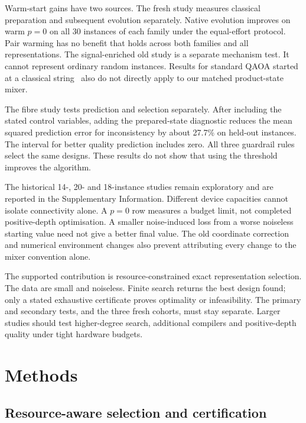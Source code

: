 \documentclass[a4paper,onecolumn,11pt,unpublished]{quantumarticle}
\theoremstyle{remark}
\begin{document}
Warm-start gains have two sources. The fresh study measures classical
preparation and subsequent evolution separately. Native evolution improves
on warm $p=0$ on all 30 instances of each family under the equal-effort
protocol. Pair warming has no benefit that holds across both families and
all representations. The signal-enriched old study is a separate mechanism
test. It cannot represent ordinary random instances. Results for standard
QAOA started at a classical string~\cite{Cain2023} also do not directly apply
to our matched product-state mixer.

The fibre study tests prediction and selection separately. After including
the stated control variables, adding the prepared-state diagnostic reduces
the mean squared prediction error for inconsistency by about 27.7\% on
held-out instances. The interval for better quality prediction includes
zero. All three guardrail rules select the same designs. These results do
not show that using the threshold improves the algorithm.

The historical 14-, 20- and 18-instance studies remain exploratory and are
reported in the Supplementary Information. Different device capacities
cannot isolate connectivity alone. A $p=0$ row measures a budget limit,
not completed positive-depth optimisation. A smaller noise-induced loss
from a worse noiseless starting value need not give a better final value.
The old coordinate correction and numerical environment changes also
prevent attributing every change to the mixer convention alone.

The supported contribution is resource-constrained exact representation
selection. The data are small and noiseless. Finite search returns the best
design found; only a stated exhaustive certificate proves optimality or
infeasibility. The primary and secondary tests, and the three fresh cohorts,
must stay separate. Larger studies should test higher-degree search,
additional compilers and positive-depth quality under tight hardware budgets.

\section{Methods}
\label{sec:methodology}
\label{sec:experiments}

\subsection{Resource-aware selection and certification}
\label{sec:selection}
\label{sec:selection-problem}
\label{sec:search-certification}
\end{document}
